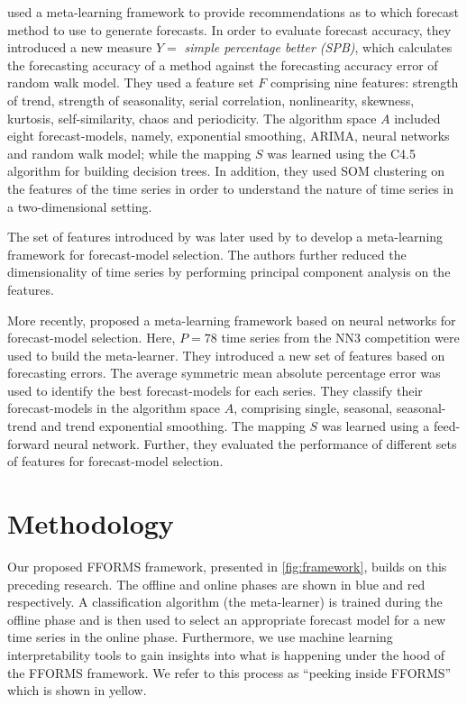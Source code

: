 \documentclass[11pt,a4paper,]{article}
\begin{document}
\textcite{wang2009rule} used a meta-learning framework to provide recommendations as to which forecast method to use to generate forecasts. In order to evaluate forecast accuracy, they introduced a new measure \(Y =\) \emph{simple percentage better (SPB)}, which calculates the forecasting accuracy of a method against the forecasting accuracy error of random walk model. They used a feature set \(F\) comprising nine features: strength of trend, strength of seasonality, serial correlation, nonlinearity, skewness, kurtosis, self-similarity, chaos and periodicity. The algorithm space \(A\) included eight forecast-models, namely, exponential smoothing, ARIMA, neural networks and random walk model; while the mapping \(S\) was learned using the C4.5 algorithm for building decision trees. In addition, they used SOM clustering on the features of the time series in order to understand the nature of time series in a two-dimensional setting.

The set of features introduced by \textcite{wang2009rule} was later used by \textcite{widodomodel} to develop a meta-learning framework for forecast-model selection. The authors further reduced the dimensionality of time series by performing principal component analysis on the features.

More recently, \textcite{kuck2016meta} proposed a meta-learning framework based on neural networks for forecast-model selection. Here, \(P = 78\) time series from the NN3 competition were used to build the meta-learner. They introduced a new set of features based on forecasting errors. The average symmetric mean absolute percentage error was used to identify the best forecast-models for each series. They classify their forecast-models in the algorithm space \(A\), comprising single, seasonal, seasonal-trend and trend exponential smoothing. The mapping \(S\) was learned using a feed-forward neural network. Further, they evaluated the performance of different sets of features for forecast-model selection.

\hypertarget{methodology}{%
\section{Methodology}\label{methodology}}

Our proposed FFORMS framework, presented in \autoref{fig:framework}, builds on this preceding research. The offline and online phases are shown in blue and red respectively. A classification algorithm (the meta-learner) is trained during the offline phase and is then used to select an appropriate forecast model for a new time series in the online phase. Furthermore, we use machine learning interpretability tools to gain insights into what is happening under the hood of the FFORMS framework. We refer to this process as ``peeking inside FFORMS'' which is shown in yellow.
\end{document}
